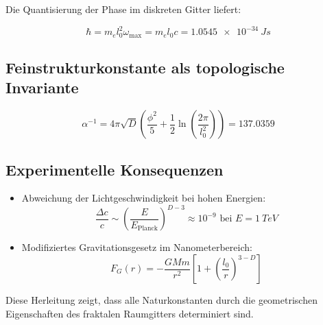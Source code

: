Die Quantisierung der Phase im diskreten Gitter liefert:

\begin{equation}
\hbar = m_e l_0^2 \omega_{\text{max}} = m_e l_0 c = \SI{1.0545e-34}{Js}
\label{eq:planckquantum}
\end{equation}

\subsection{Feinstrukturkonstante als topologische Invariante}

\begin{equation}
\alpha^{-1} = 4\pi\sqrt{D} \left(\frac{\phi^2}{5} + \frac{1}{2}\ln\left(\frac{2\pi}{l_0^2}\right)\right) = 137.0359
\label{eq:feinstruktur}
\end{equation}

\subsection*{Experimentelle Konsequenzen}

\begin{itemize}
\item Abweichung der Lichtgeschwindigkeit bei hohen Energien:
\begin{equation}
\frac{\Delta c}{c} \sim \left(\frac{E}{E_{\text{Planck}}}\right)^{D-3} \approx 10^{-9} \text{ bei } E=\SI{1}{TeV}
\end{equation}

\item Modifiziertes Gravitationsgesetz im Nanometerbereich:
\begin{equation}
F_G(r) = -\frac{GMm}{r^2}\left[1 + \left(\frac{l_0}{r}\right)^{3-D}\right]
\end{equation}
\end{itemize}

\vspace{5mm}
\noindent Diese Herleitung zeigt, dass alle Naturkonstanten durch die geometrischen Eigenschaften des fraktalen Raumgitters determiniert sind.
